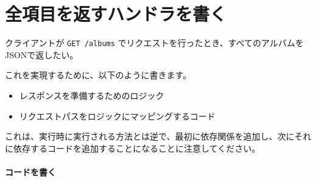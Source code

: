 

\section{全項目を返すハンドラを書く}

クライアントが \texttt{GET\ /albums}
でリクエストを行ったとき、すべてのアルバムをJSONで返したい。

これを実現するために、以下のように書きます。

\begin{itemize}
\item
  レスポンスを準備するためのロジック
\item
  リクエストパスをロジックにマッピングするコード
\end{itemize}

これは、実行時に実行される方法とは逆で、最初に依存関係を追加し、次にそれに依存するコードを追加することになることに注意してください。


\paragraph{コードを書く}

